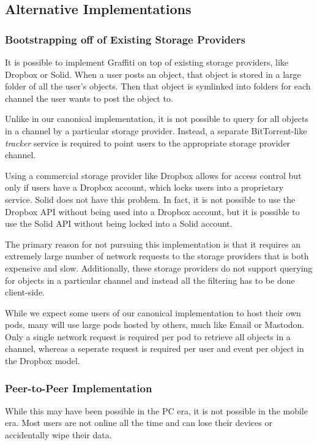 \subsection{Alternative Implementations}

\subsubsection{Bootstrapping off of Existing Storage Providers}

It is possible to implement Graffiti on top of existing storage providers,
like Dropbox or Solid. When a user posts an object, that object is stored in
a large folder of all the user's objects. Then that object is symlinked into
folders for each channel the user wants to post the object to.

Unlike in our canonical implementation, it is not possible to query for
all objects in a channel by a particular storage provider. Instead, a
separate BitTorrent-like \emph{tracker} service is required to
point users to the appropriate storage provider channel.

Using a commercial storage provider like Dropbox allows for access control but only if users
have a Dropbox account, which locks users into a proprietary service.
Solid does not have this problem. In fact, it is not possible to use the Dropbox API
without being used into a Dropbox account, but it is possible to use the Solid API
without being locked into a Solid account.

The primary reason for not pursuing this implementation is that it requires
an extremely large number of network requests to the storage providers
that is both expensive and slow. Additionally, these storage providers
do not support querying for objects in a particular channel and instead
all the filtering has to be done client-side.

While we expect some users of our canonical implementation to host their own pods,
many will use large pods hosted by others, much like Email or Mastodon.
Only a single network request is required per pod to retrieve all objects in a channel,
whereas a seperate request is required per user and event per object in the Dropbox model.

\subsubsection{Peer-to-Peer Implementation}

While this may have been possible in the PC era, it is not possible in the mobile era.
Most users are not online all the time and can lose their devices or accidentally wipe their data.
